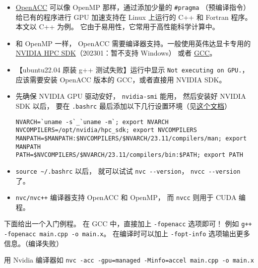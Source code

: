 
\begin{issues}
\issueDraft
\end{issues}


\begin{itemize}
\item \href{https://www.openacc.org/}{OpenACC} 可以像 OpenMP 那样，通过添加少量的 \verb`#pragma` （预编译指令）给已有的程序进行 GPU 加速支持在 Linux 上运行的 C++ 和 Fortran 程序。本文以 C++ 为例。 它由于易用性，它常用于高性能科学计算中。
\item 和 OpenMP 一样， OpenACC 需要编译器支持。一般使用英伟达显卡专用的 \href{https://developer.nvidia.com/hpc-sdk}{NVIDIA HPC SDK}（202301：暂不支持 Windows） 或者 \href{https://www.openacc.org/tools/gcc-for-openacc}{GCC}。
\item 【ubuntu22.04 原装 g++ 测试失败】运行中显示 \verb`Not executing on GPU.`，应该需要安装 OpenACC 版本的 GCC，或者直接用 NVIDIA SDK。
\item 先确保 NVIDIA GPU 驱动安好， \verb`nvidia-smi` 能用， 然后安装好 NVIDIA SDK 以后， 要在 \verb`.bashrc` 最后添加以下几行设置环境（见\href{https://docs.nvidia.com/hpc-sdk//hpc-sdk-install-guide/index.html}{这个文档}）
\begin{lstlisting}[language=none]
NVARCH=`uname -s`_`uname -m`; export NVARCH
NVCOMPILERS=/opt/nvidia/hpc_sdk; export NVCOMPILERS
MANPATH=$MANPATH:$NVCOMPILERS/$NVARCH/23.11/compilers/man; export MANPATH
PATH=$NVCOMPILERS/$NVARCH/23.11/compilers/bin:$PATH; export PATH
\end{lstlisting}
\item \verb`source ~/.bashrc` 以后， 就可以试试 \verb`nvc --version`， \verb`nvcc --version` 了。
\item \verb`nvc/nvc++` 编译器支持 OpenACC 和 OpenMP， 而 \verb`nvcc` 则用于 CUDA 编程。
\end{itemize}

下面给出一个入门例程。 在 GCC 中，直接加上 \verb`-fopenacc` 选项即可！ 例如 \verb`g++ -fopenacc main.cpp -o main.x`。 在编译时可以加上 \verb`-fopt-info` 选项输出更多信息。（编译失败）

用 Nvidia 编译器如 \verb`nvc -acc -gpu=managed -Minfo=accel main.cpp -o main.x`

